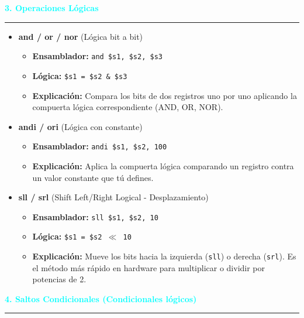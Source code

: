 \documentclass{article}
\begin{document}
\vspace{0.5cm}
\noindent\textcolor{cyan}{\Large\textbf{3. Operaciones Lógicas}}
\vspace{0.2cm}\hrule\vspace{0.3cm}

\begin{itemize}
    \item \textbf{\large and / or / nor} (Lógica bit a bit)
    \begin{itemize}
        \item \textbf{Ensamblador:} \texttt{and \$s1, \$s2, \$s3}
        \item \textbf{Lógica:} \texttt{\$s1 = \$s2 \& \$s3}
        \item \textbf{Explicación:} Compara los bits de dos registros uno por uno aplicando la compuerta lógica correspondiente (AND, OR, NOR).
    \end{itemize}
    \vspace{0.2cm}

    \item \textbf{\large andi / ori} (Lógica con constante)
    \begin{itemize}
        \item \textbf{Ensamblador:} \texttt{andi \$s1, \$s2, 100}
        \item \textbf{Explicación:} Aplica la compuerta lógica comparando un registro contra un valor constante que tú defines.
    \end{itemize}
    \vspace{0.2cm}

    \item \textbf{\large sll / srl} (Shift Left/Right Logical - Desplazamiento)
    \begin{itemize}
        \item \textbf{Ensamblador:} \texttt{sll \$s1, \$s2, 10}
        \item \textbf{Lógica:} \texttt{\$s1 = \$s2 $\ll$ 10}
        \item \textbf{Explicación:} Mueve los bits hacia la izquierda (\texttt{sll}) o derecha (\texttt{srl}). Es el método más rápido en hardware para multiplicar o dividir por potencias de 2.
    \end{itemize}
\end{itemize}

\vspace{0.5cm}
\noindent\textcolor{cyan}{\Large\textbf{4. Saltos Condicionales (Condicionales lógicos)}}
\vspace{0.2cm}\hrule\vspace{0.3cm}
\end{document}
